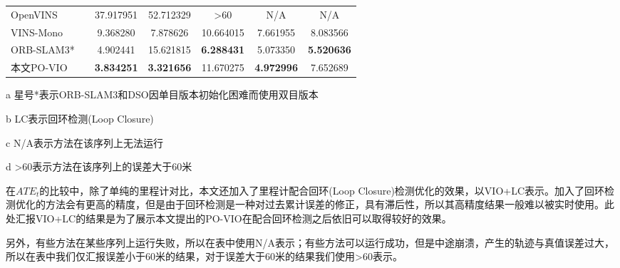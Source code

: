 \begin{table}
\begin{threeparttable}
\begin{tabular}{lcccccc}
OpenVINS        &                         & 37.917951                                & 52.712329                                & {\textgreater{}60}                               & N/A                                      & N/A                                      \\
VINS-Mono       &                         & 9.368280                                 & 7.878626                                 & 10.664015                                & 7.661955                                 & 8.083566                                 \\
ORB-SLAM3*       &                         & 4.902441                                 & 15.621815                                & \cellcolor[HTML]{FFCCC9}\textbf{6.288431}                                 & 5.073350                                 & \cellcolor[HTML]{FFCCC9}\textbf{5.520636}                                 \\
本文PO-VIO            &                         & \cellcolor[HTML]{FFCCC9}\textbf{3.834251}                                 & \cellcolor[HTML]{FFCCC9}\textbf{3.321656}                                 & 11.670275                                & \cellcolor[HTML]{FFCCC9}\textbf{4.972996}                                 & 7.652689                                 \\ \bottomrule
\end{tabular}
\label{tab:vio_ate}
\begin{tablenotes}
  \item [a] 星号*表示ORB-SLAM3和DSO因单目版本初始化困难而使用双目版本
  \item [b] LC表示回环检测(Loop Closure)
  \item [c] N/A表示方法在该序列上无法运行
  \item [d] \textgreater{}60表示方法在该序列上的误差大于60米
\end{tablenotes}
\end{threeparttable}
\end{table}

在$ATE_t$的比较中，除了单纯的里程计对比，本文还加入了里程计配合回环(Loop Closure)检测优化的效果，以VIO+LC表示。加入了回环检测优化的方法会有更高的精度，但是由于回环检测是一种对过去累计误差的修正，具有滞后性，所以其高精度结果一般难以被实时使用。此处汇报VIO+LC的结果是为了展示本文提出的PO-VIO在配合回环检测之后依旧可以取得较好的效果。

另外，有些方法在某些序列上运行失败，所以在表中使用N/A表示；有些方法可以运行成功，但是中途崩溃，产生的轨迹与真值误差过大，所以在表中我们仅汇报误差小于60米的结果，对于误差大于60米的结果我们使用\textgreater{}60表示。

